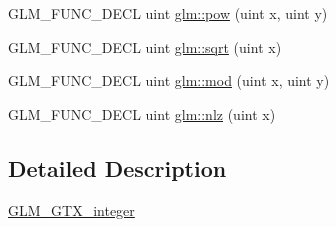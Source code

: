 \begin{DoxyCompactItemize}
\item 
G\+L\+M\+\_\+\+F\+U\+N\+C\+\_\+\+D\+E\+CL uint \hyperlink{group__gtx__integer_gaa8229e850c3cc4ad83492fe390ada044}{glm\+::pow} (uint x, uint y)
\item 
G\+L\+M\+\_\+\+F\+U\+N\+C\+\_\+\+D\+E\+CL uint \hyperlink{group__gtx__integer_ga457e9efca8339bf918d319e9c55f7c8f}{glm\+::sqrt} (uint x)
\item 
G\+L\+M\+\_\+\+F\+U\+N\+C\+\_\+\+D\+E\+CL uint \hyperlink{group__gtx__integer_gab8f9ec0ca93ca90669434224818f0750}{glm\+::mod} (uint x, uint y)
\item 
G\+L\+M\+\_\+\+F\+U\+N\+C\+\_\+\+D\+E\+CL uint \hyperlink{group__gtx__integer_gacbe62fd2384464c16ea30ecc4defc11c}{glm\+::nlz} (uint x)
\end{DoxyCompactItemize}


\subsection{Detailed Description}
\hyperlink{group__gtx__integer}{G\+L\+M\+\_\+\+G\+T\+X\+\_\+integer} 